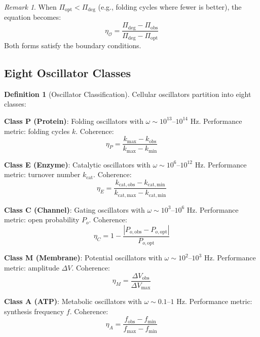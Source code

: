 \documentclass[10pt,twocolumn]{article}
\theoremstyle{plain}
\theoremstyle{definition}
\newtheorem{definition}[theorem]{Definition}
\theoremstyle{remark}
\newtheorem{remark}[theorem]{Remark}
\begin{document}
\begin{remark}
When $\Pi_{\mathrm{opt}} < \Pi_{\mathrm{deg}}$ (e.g., folding cycles where fewer is better), the equation becomes:
\begin{equation}
\eta_{\mathcal{O}} = \frac{\Pi_{\mathrm{deg}} - \Pi_{\mathrm{obs}}}{\Pi_{\mathrm{deg}} - \Pi_{\mathrm{opt}}}
\end{equation}
Both forms satisfy the boundary conditions.
\end{remark}

\subsection{Eight Oscillator Classes}

\begin{definition}[Oscillator Classification]
\label{def:oscillator_classes}
Cellular oscillators partition into eight classes:

\textbf{Class P (Protein)}: Folding oscillators with $\omega \sim 10^{13}$--$10^{14}$ Hz. Performance metric: folding cycles $k$. Coherence:
\begin{equation}
\eta_P = \frac{k_{\max} - k_{\mathrm{obs}}}{k_{\max} - k_{\min}}
\end{equation}

\textbf{Class E (Enzyme)}: Catalytic oscillators with $\omega \sim 10^{6}$--$10^{12}$ Hz. Performance metric: turnover number $k_{\mathrm{cat}}$. Coherence:
\begin{equation}
\eta_E = \frac{k_{\mathrm{cat,obs}} - k_{\mathrm{cat,min}}}{k_{\mathrm{cat,max}} - k_{\mathrm{cat,min}}}
\end{equation}

\textbf{Class C (Channel)}: Gating oscillators with $\omega \sim 10^{3}$--$10^{6}$ Hz. Performance metric: open probability $P_o$. Coherence:
\begin{equation}
\eta_C = 1 - \frac{|P_{o,\mathrm{obs}} - P_{o,\mathrm{opt}}|}{P_{o,\mathrm{opt}}}
\end{equation}

\textbf{Class M (Membrane)}: Potential oscillators with $\omega \sim 10^{2}$--$10^{3}$ Hz. Performance metric: amplitude $\Delta V$. Coherence:
\begin{equation}
\eta_M = \frac{\Delta V_{\mathrm{obs}}}{\Delta V_{\max}}
\end{equation}

\textbf{Class A (ATP)}: Metabolic oscillators with $\omega \sim 0.1$--$1$ Hz. Performance metric: synthesis frequency $f$. Coherence:
\begin{equation}
\eta_A = \frac{f_{\mathrm{obs}} - f_{\min}}{f_{\max} - f_{\min}}
\end{equation}


\end{definition}
\end{document}
